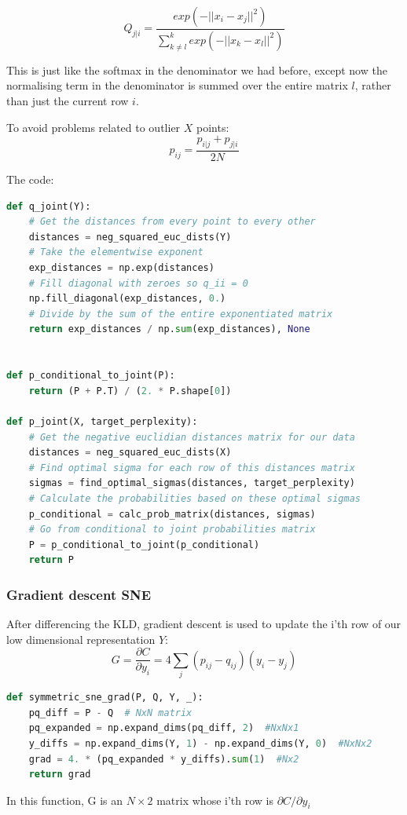 $$ Q_{j|i}=\frac{exp(-||x_i - x_j||^2)}{\sum_{k\neq l}^kexp(-||x_k - x_l||^2)} $$

This is just like the softmax in the denominator we had before, except now the normalising term in the denominator is summed over the entire matrix $l$, rather than just the current row $i$.

To avoid problems related to outlier $X$ points:
$$ p_{ij}= \frac{p_{i|j} + p_{j|i}}{2N}$$

The code:
\begin{lstlisting}[language=Python]
def q_joint(Y):
    # Get the distances from every point to every other
    distances = neg_squared_euc_dists(Y)
    # Take the elementwise exponent
    exp_distances = np.exp(distances)
    # Fill diagonal with zeroes so q_ii = 0
    np.fill_diagonal(exp_distances, 0.)
    # Divide by the sum of the entire exponentiated matrix
    return exp_distances / np.sum(exp_distances), None


def p_conditional_to_joint(P):
    return (P + P.T) / (2. * P.shape[0])
    
def p_joint(X, target_perplexity):
    # Get the negative euclidian distances matrix for our data
    distances = neg_squared_euc_dists(X)
    # Find optimal sigma for each row of this distances matrix
    sigmas = find_optimal_sigmas(distances, target_perplexity)
    # Calculate the probabilities based on these optimal sigmas
    p_conditional = calc_prob_matrix(distances, sigmas)
    # Go from conditional to joint probabilities matrix
    P = p_conditional_to_joint(p_conditional)
    return P
\end{lstlisting}

\subsubsection{Gradient descent SNE}
After differencing the KLD, gradient descent is used to update the i'th row of our low dimensional representation $Y$:
$$ G = \frac{\partial C}{\partial y_i} = 4\sum_j (p_{ij} - q_{ij}) (y_i - y_j)$$

\begin{lstlisting}[language=Python]
def symmetric_sne_grad(P, Q, Y, _):
    pq_diff = P - Q  # NxN matrix
    pq_expanded = np.expand_dims(pq_diff, 2)  #NxNx1
    y_diffs = np.expand_dims(Y, 1) - np.expand_dims(Y, 0)  #NxNx2
    grad = 4. * (pq_expanded * y_diffs).sum(1)  #Nx2
    return grad
\end{lstlisting}

In this function, G is an $N\times2$ matrix whose i’th row is $\partial C / \partial y_i$

